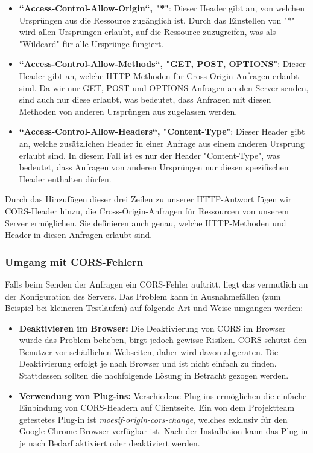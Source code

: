 \begin{itemize}
\item \textbf{``Access-Control-Allow-Origin``, "*"}: Dieser Header gibt an, von welchen Ursprüngen aus die Ressource zugänglich ist. Durch das Einstellen von "*" wird allen Ursprüngen erlaubt, auf die Ressource zuzugreifen, was als "Wildcard" für alle Ursprünge fungiert.
\item \textbf{``Access-Control-Allow-Methods``, "GET, POST, OPTIONS"}: Dieser Header gibt an, welche HTTP-Methoden für Cross-Origin-Anfragen erlaubt sind. Da wir nur GET, POST und OPTIONS-Anfragen an den Server senden, sind auch nur diese erlaubt, was bedeutet, dass Anfragen mit diesen Methoden von anderen Ursprüngen aus zugelassen werden.
\item \textbf{``Access-Control-Allow-Headers``, "Content-Type"}: Dieser Header gibt an, welche zusätzlichen Header in einer Anfrage aus einem anderen Ursprung erlaubt sind. In diesem Fall ist es nur der Header "Content-Type", was bedeutet, dass Anfragen von anderen Ursprüngen nur diesen spezifischen Header enthalten dürfen.
\end{itemize}

Durch das Hinzufügen dieser drei Zeilen zu unserer HTTP-Antwort fügen wir CORS-Header hinzu, die Cross-Origin-Anfragen für Ressourcen von unserem Server ermöglichen. Sie definieren auch genau, welche HTTP-Methoden und Header in diesen Anfragen erlaubt sind.

\subsubsection*{Umgang mit CORS-Fehlern}
Falls beim Senden der Anfragen ein CORS-Fehler auftritt, liegt das vermutlich an der Konfiguration des Servers. Das Problem kann in Ausnahmefällen (zum Beispiel bei kleineren Testläufen) auf folgende Art und Weise umgangen werden:

\begin{itemize}
\item \textbf{Deaktivieren im Browser:} Die Deaktivierung von CORS im Browser würde das Problem beheben, birgt jedoch gewisse Risiken. CORS schützt den Benutzer vor schädlichen Webseiten, daher wird davon abgeraten. Die Deaktivierung erfolgt je nach Browser und ist nicht einfach zu finden. Stattdessen sollten die nachfolgende Lösung in Betracht gezogen werden.
\item \textbf{Verwendung von Plug-ins:} Verschiedene Plug-ins ermöglichen die einfache Einbindung von CORS-Headern auf Clientseite. Ein von dem Projektteam getestetes Plug-in ist \textit{moesif-origin-cors-change}, welches exklusiv für den Google Chrome-Browser verfügbar ist. Nach der Installation kann das Plug-in je nach Bedarf aktiviert oder deaktiviert werden.
\end{itemize}

